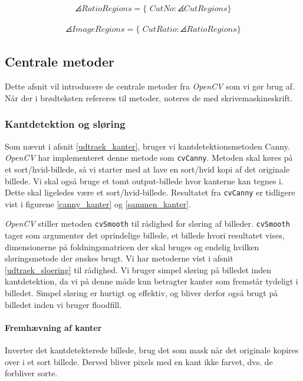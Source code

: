 {\begin{eqnarray}
    \angles{RatioRegions} = \{ \textit{~CutNo} : \angles{CutRegions} \}
\end{eqnarray}

\begin{eqnarray}
    \angles{ImageRegions} = \{ \textit{~CutRatio} : \angles{RatioRegions} \}
\end{eqnarray}

\subsection{Centrale metoder}
Dette afsnit vil introducere de centrale metoder fra \emph{OpenCV} som
vi gør brug af.  Når der i brødteksten refereres til metoder, noteres de
med skrivemaskineskrift.

\subsubsection{Kantdetektion og sløring}
Som nævnt i afsnit \ref{udtraek_kanter}, bruger vi kantdetektionsmetoden
Canny. \emph{OpenCV} har implementeret denne metode som
\texttt{cvCanny}. Metoden skal køres på et sort/hvid-billede, så vi
starter med at lave en sort/hvid kopi af det originale billede. Vi skal
også bruge et tomt output-billede hvor kanterne kan tegnes i. Dette skal
ligeledes være et sort/hvid-billede. Resultatet fra \texttt{cvCanny} er
tidligere vist i figurene \ref{canny_kanter} og \ref{sammen_kanter}.

\emph{OpenCV} stiller metoden \texttt{cvSmooth} til rådighed for sløring
af billeder. \texttt{cvSmooth} tager som argumenter det oprindelige
billede, et billede hvori resultatet vises, dimensionerne på
foldningsmatricen der skal bruges og endelig hvilken sløringsmetode der
ønskes brugt. Vi har metoderne vist i afsnit \ref{udtraek_sloering} til
rådighed. Vi bruger simpel sløring på billedet inden kantdetektion, da
vi på denne måde kun betragter kanter som fremstår tydeligt i billedet.
Simpel sløring er hurtigt og effektiv, og bliver derfor også brugt på
billedet inden vi bruger floodfill.

\paragraph{Fremhævning af kanter}
Inverter det kantdetekterede billede, brug det som mask når det
originale kopires over i et sort billede. Derved bliver pixels med en
kant ikke farvet, dvs. de forbliver sorte.

}
